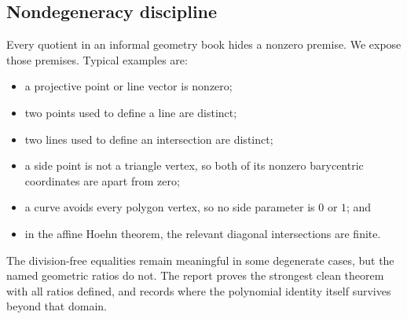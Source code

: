 \subsection{Nondegeneracy discipline}

Every quotient in an informal geometry book hides a nonzero premise.  We expose those premises.  Typical examples are:
\begin{itemize}
\item a projective point or line vector is nonzero;
\item two points used to define a line are distinct;
\item two lines used to define an intersection are distinct;
\item a side point is not a triangle vertex, so both of its nonzero barycentric coordinates are apart from zero;
\item a curve avoids every polygon vertex, so no side parameter is $0$ or $1$; and
\item in the affine Hoehn theorem, the relevant diagonal intersections are finite.
\end{itemize}
The division-free equalities remain meaningful in some degenerate cases, but the named geometric ratios do not.  The report proves the strongest clean theorem with all ratios defined, and records where the polynomial identity itself survives beyond that domain.
